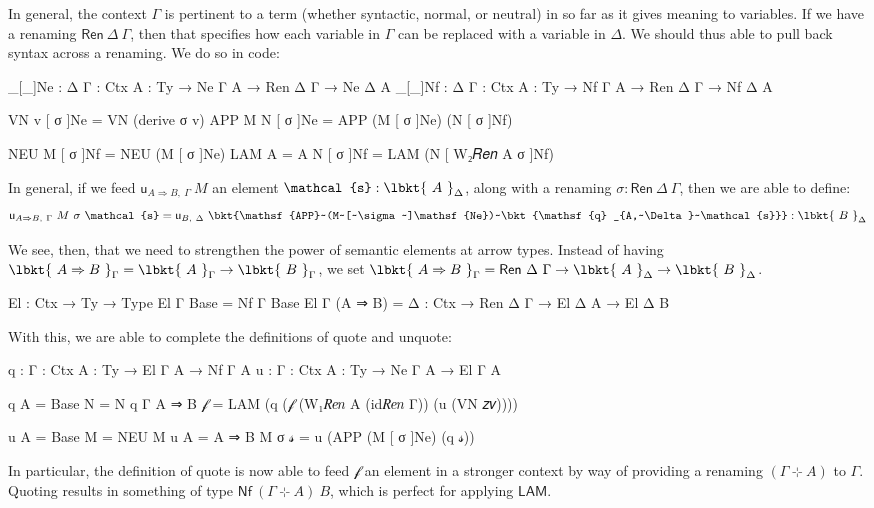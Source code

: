 In general, the context $\Gamma$ is pertinent to a term (whether syntactic,
normal, or neutral) in so far as it gives meaning to variables. If we have a
renaming $\mathsf{Ren}~\Delta~\Gamma$, then that specifies how each variable
in $\Gamma$ can be replaced with a variable in $\Delta$. We should thus able to
pull back syntax across a renaming. We do so in code:
\begin{code}
_[_]Ne : {Δ Γ : Ctx} {A : Ty} → Ne Γ A → Ren Δ Γ → Ne Δ A
_[_]Nf : {Δ Γ : Ctx} {A : Ty} → Nf Γ A → Ren Δ Γ → Nf Δ A

VN v [ σ ]Ne = VN (derive σ v)
APP M N [ σ ]Ne = APP (M [ σ ]Ne) (N [ σ ]Nf)

NEU M [ σ ]Nf = NEU (M [ σ ]Ne)
LAM {A = A} N [ σ ]Nf = LAM (N [ W₂𝑅𝑒𝑛 A σ ]Nf)
\end{code}

In general, if we feed $\mathsf{u}_{A \Rightarrow B,~\Gamma}~M$ an element
$\mathcal{s} : \lbkt{~A~}_\Delta$, along with a renaming $\sigma : \mathsf{Ren}
~\Delta~\Gamma$, then we are able to define:
\[\mathsf{u}_{A \Rightarrow B,~\Gamma}~M~\sigma~\mathcal{s} = \mathsf{u}
_{B,~\Delta}~\bkt{\mathsf{APP}~(M~[~\sigma~]\mathsf{Ne})~\bkt{\mathsf{q}
_{A,~\Delta}~\mathcal{s}}} : \lbkt{~B~}_\Delta\]

We see, then, that we need to strengthen the power of semantic elements at arrow
types. Instead of having $\lbkt{~A\Rightarrow B~}_\Gamma = \lbkt{~A~}_\Gamma \to
\lbkt{~B~}_\Gamma$, we set $\lbkt{~A\Rightarrow B~}_\Gamma = \mathsf{Ren}~\Delta
~\Gamma \to \lbkt{~A~}_\Delta \to \lbkt{~B~}_\Delta$.
\begin{code}
El : Ctx → Ty → Type
El Γ Base = Nf Γ Base
El Γ (A ⇒ B) = {Δ : Ctx} → Ren Δ Γ → El Δ A → El Δ B
\end{code}
With this, we are able to complete the definitions of quote and unquote:
\begin{code}
q : {Γ : Ctx} {A : Ty} → El Γ A → Nf Γ A
u : {Γ : Ctx} {A : Ty} → Ne Γ A → El Γ A

q {A = Base} N = N
q {Γ} {A ⇒ B} 𝒻 = LAM (q (𝒻 (W₁𝑅𝑒𝑛 A (id𝑅𝑒𝑛 Γ)) (u (VN 𝑧𝑣))))

u {A = Base} M = NEU M
u {A = A ⇒ B} M σ 𝓈 = u (APP (M [ σ ]Ne) (q 𝓈))
\end{code}
In particular, the definition of quote is now able to feed $\mathcal{f}$ an
element in a stronger context by way of providing a renaming
$(\Gamma~\hermitmatrix~A)$ to $\Gamma$. Quoting results in something of type
$\mathsf{Nf}~(\Gamma~\hermitmatrix~A)~B$, which is perfect for applying
$\mathsf{LAM}$.

